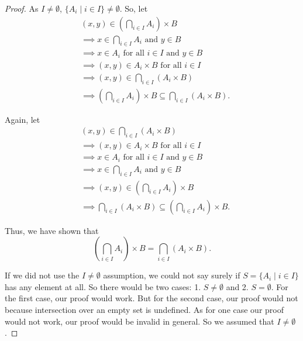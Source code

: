 \documentclass[12pt]{article}
\begin{document}
\begin{proof}
	As \( I\neq \emptyset \), \( \{A_{i} \mid i\in I\}\neq \emptyset \). So, let
	\begin{align*}
		 & (x, y) \in \left( \bigcap_{i \in I} A_{i} \right) \times B                                           \\
		 & \implies x \in \bigcap_{i \in I} A_{i} \text{ and } y \in B                                          \\
		 & \implies x \in A_{i} \text{ for all } i \in I \text{ and } y \in B                                   \\
		 & \implies (x, y) \in A_{i} \times B \text{ for all } i \in I                                          \\
		 & \implies (x, y) \in \bigcap_{i \in I} (A_{i} \times B)                                               \\
		 & \implies \left( \bigcap_{i\in I} A_{i}  \right) \times B \subseteq  \bigcap_{i\in I}(A_{i} \times B).
	\end{align*}

	Again, let
	\begin{align*}
		 & (x, y) \in \bigcap_{i \in I} (A_{i} \times B)                                                       \\
		 & \implies (x, y) \in A_{i} \times B \text{ for all } i \in I                                         \\
		 & \implies x \in A_{i} \text{ for all } i \in I \text{ and } y \in B                                  \\
		 & \implies x \in \bigcap_{i \in I} A_{i} \text{ and } y \in B                                         \\
		 & \implies (x, y) \in \left( \bigcap_{i \in I} A_{i} \right) \times B                                 \\
		 & \implies \bigcap_{i\in I}(A_{i} \times B) \subseteq \left( \bigcap_{i\in I} A_{i}  \right)\times B.
	\end{align*}

	Thus, we have shown that
	\[
		\left( \bigcap_{i \in I} A_{i} \right) \times B = \bigcap_{i \in I} (A_{i} \times B).
	\]

	If we did not use the \( I\neq \emptyset \) assumption, we could not say surely if \( S = \{A_{i} \mid i\in I\} \) has any element at all. So there would be two cases: 1. \( S\neq \emptyset \) and 2. \( S=\emptyset \). For the first case, our proof would work. But for the second case, our proof would not because intersection over an empty set is undefined. As for one case our proof would not work, our proof would be invalid in general. So we assumed that \( I\neq \emptyset \).
\end{proof}
\end{document}
